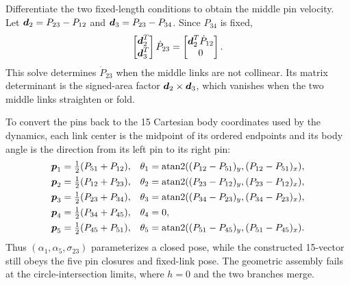 \documentclass[../main.tex]{subfiles}
\begin{document}
Differentiate the two fixed-length conditions to obtain the middle pin velocity. Let $\boldsymbol{d}_2=P_{23}-P_{12}$ and $\boldsymbol{d}_3=P_{23}-P_{34}$. Since $P_{34}$ is fixed,
\begin{equation}
\begin{bmatrix}\boldsymbol{d}_2^T\\\boldsymbol{d}_3^T\end{bmatrix}\dot P_{23}
=\begin{bmatrix}\boldsymbol{d}_2^T\dot P_{12}\\0\end{bmatrix}.
\label{eq:five-link-middle-pin-velocity}
\end{equation}
This solve determines $\dot P_{23}$ when the middle links are not collinear. Its matrix determinant is the signed-area factor $\boldsymbol{d}_2\times\boldsymbol{d}_3$, which vanishes when the two middle links straighten or fold.

To convert the pins back to the 15 Cartesian body coordinates used by the dynamics, each link center is the midpoint of its ordered endpoints and its body angle is the direction from its left pin to its right pin:
\begin{equation}
\begin{aligned}
\boldsymbol{p}_1&=\tfrac12(P_{51}+P_{12}), &\theta_1&=\operatorname{atan2}((P_{12}-P_{51})_y,(P_{12}-P_{51})_x),\\
\boldsymbol{p}_2&=\tfrac12(P_{12}+P_{23}), &\theta_2&=\operatorname{atan2}((P_{23}-P_{12})_y,(P_{23}-P_{12})_x),\\
\boldsymbol{p}_3&=\tfrac12(P_{23}+P_{34}), &\theta_3&=\operatorname{atan2}((P_{34}-P_{23})_y,(P_{34}-P_{23})_x),\\
\boldsymbol{p}_4&=\tfrac12(P_{34}+P_{45}), &\theta_4&=0,\\
\boldsymbol{p}_5&=\tfrac12(P_{45}+P_{51}), &\theta_5&=\operatorname{atan2}((P_{51}-P_{45})_y,(P_{51}-P_{45})_x).
\end{aligned}
\label{eq:five-link-pin-to-cartesian-poses}
\end{equation}
Thus $(\alpha_1,\alpha_5,\sigma_{23})$ parameterizes a closed pose, while the constructed 15-vector still obeys the five pin closures and fixed-link pose. The geometric assembly fails at the circle-intersection limits, where $h=0$ and the two branches merge.
\end{document}
